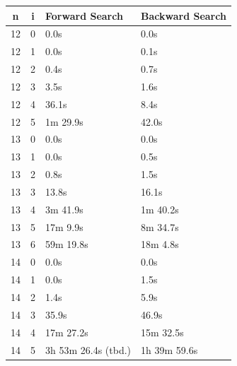 \documentclass[10pt,journal,compsoc]{IEEEtran}
\begin{document}
\begin{table}[htbp]
  \begin{tabular}{c|c|l|l}
    \textbf{n} & \textbf{i} & \textbf{Forward Search}  & \textbf{Backward Search} \\ \hline
    12         & 0          & 0.0s                     & 0.0s                     \\
    12         & 1          & 0.0s                     & 0.1s                     \\
    12         & 2          & 0.4s                     & 0.7s                     \\
    12         & 3          & 3.5s                     & 1.6s                     \\
    12         & 4          & 36.1s                    & 8.4s                     \\
    12         & 5          & 1m 29.9s                 & 42.0s                    \\
    \hline
    13         & 0          & 0.0s                     & 0.0s                     \\
    13         & 1          & 0.0s                     & 0.5s                     \\
    13         & 2          & 0.8s                     & 1.5s                     \\
    13         & 3          & 13.8s                    & 16.1s                    \\
    13         & 4          & 3m 41.9s                 & 1m 40.2s                 \\
    13         & 5          & 17m 9.9s                 & 8m 34.7s                 \\
    13         & 6          & 59m 19.8s                & 18m 4.8s                 \\
    \hline
    14         & 0          & 0.0s                     & 0.0s                     \\
    14         & 1          & 0.0s                     & 1.5s                     \\
    14         & 2          & 1.4s                     & 5.9s                     \\
    14         & 3          & 35.9s                    & 46.9s                    \\
    14         & 4          & 17m 27.2s                & 15m 32.5s                \\
    14         & 5          & 3h 53m 26.4s (tbd.)      & 1h 39m 59.6s             \\

\end{tabular}
\end{table}
\end{document}
